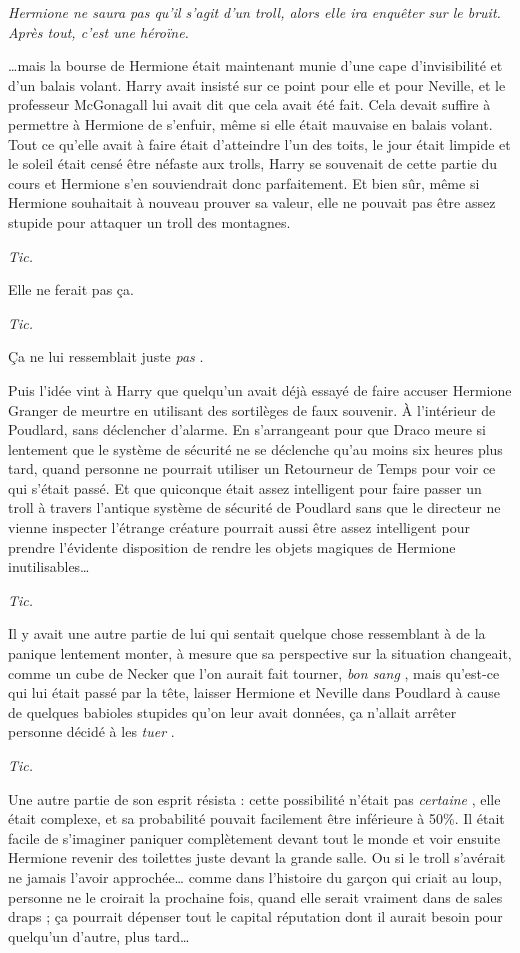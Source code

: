 \emph{Hermione ne saura pas qu'il s'agit d'un troll, alors elle ira enquêter sur le bruit. Après tout, c'est une héroïne.} 

…mais la bourse de Hermione était maintenant munie d'une cape d'invisibilité et d'un balais volant. Harry avait insisté sur ce point pour elle et pour Neville, et le professeur McGonagall lui avait dit que cela avait été fait. Cela devait suffire à permettre à Hermione de s'enfuir, même si elle était mauvaise en balais volant. Tout ce qu'elle avait à faire était d'atteindre l'un des toits, le jour était limpide et le soleil était censé être néfaste aux trolls, Harry se souvenait de cette partie du cours et Hermione s'en souviendrait donc parfaitement. Et bien sûr, même si Hermione souhaitait à nouveau prouver sa valeur, elle ne pouvait pas être assez stupide pour attaquer un troll des montagnes.

\emph{Tic.} 

Elle ne ferait pas ça.

\emph{Tic.} 

Ça ne lui ressemblait juste \emph{pas} .

Puis l'idée vint à Harry que quelqu'un avait déjà essayé de faire accuser Hermione Granger de meurtre en utilisant des sortilèges de faux souvenir. À l'intérieur de Poudlard, sans déclencher d'alarme. En s'arrangeant pour que Draco meure si lentement que le système de sécurité ne se déclenche qu'au moins six heures plus tard, quand personne ne pourrait utiliser un Retourneur de Temps pour voir ce qui s'était passé. Et que quiconque était assez intelligent pour faire passer un troll à travers l'antique système de sécurité de Poudlard sans que le directeur ne vienne inspecter l'étrange créature pourrait aussi être assez intelligent pour prendre l'évidente disposition de rendre les objets magiques de Hermione inutilisables…

\emph{Tic.} 

Il y avait une autre partie de lui qui sentait quelque chose ressemblant à de la panique lentement monter, à mesure que sa perspective sur la situation changeait, comme un cube de Necker que l'on aurait fait tourner, \emph{bon sang} , mais qu'est-ce qui lui était passé par la tête, laisser Hermione et Neville dans Poudlard à cause de quelques babioles stupides qu'on leur avait données, ça n'allait arrêter personne décidé à les \emph{tuer} .

\emph{Tic.} 

Une autre partie de son esprit résista : cette possibilité n'était pas \emph{certaine} , elle était complexe, et sa probabilité pouvait facilement être inférieure à 50\%. Il était facile de s'imaginer paniquer complètement devant tout le monde et voir ensuite Hermione revenir des toilettes juste devant la grande salle. Ou si le troll s'avérait ne jamais l'avoir approchée… comme dans l'histoire du garçon qui criait au loup, personne ne le croirait la prochaine fois, quand elle serait vraiment dans de sales draps ; ça pourrait dépenser tout le capital réputation dont il aurait besoin pour quelqu'un d'autre, plus tard…


